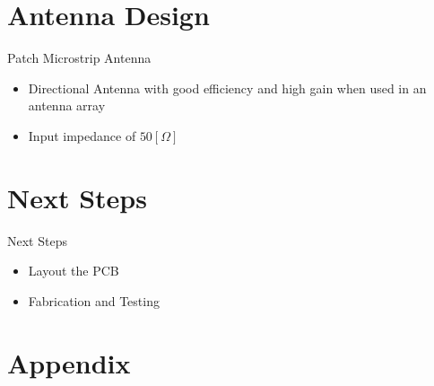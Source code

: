 \documentclass{beamer}
\begin{document}

\section{Antenna Design}
\begin{frame}{Patch Microstrip Antenna}
  \begin{itemize}
    \item <1-> Directional Antenna with good efficiency and high gain when used in an antenna array
    \item <2-> Input impedance of \(50[\Omega]\)
  \end{itemize}
\end{frame}



\section{Next Steps}

\begin{frame}{Next Steps}
\begin{itemize}
  \item <1-> Layout the PCB
  \item <2-> Fabrication and Testing
\end{itemize}
\end{frame}

\section*{Appendix}
\end{document}
